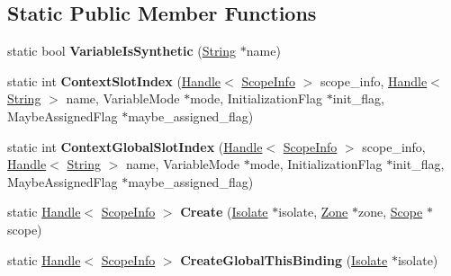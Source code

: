 \subsection*{Static Public Member Functions}
\begin{DoxyCompactItemize}
\item 
static bool {\bfseries Variable\+Is\+Synthetic} (\hyperlink{classv8_1_1internal_1_1_string}{String} $\ast$name)\hypertarget{classv8_1_1internal_1_1_scope_info_a580c5f8d07bb972bbd475b2ade6e18a5}{}\label{classv8_1_1internal_1_1_scope_info_a580c5f8d07bb972bbd475b2ade6e18a5}

\item 
static int {\bfseries Context\+Slot\+Index} (\hyperlink{classv8_1_1internal_1_1_handle}{Handle}$<$ \hyperlink{classv8_1_1internal_1_1_scope_info}{Scope\+Info} $>$ scope\+\_\+info, \hyperlink{classv8_1_1internal_1_1_handle}{Handle}$<$ \hyperlink{classv8_1_1internal_1_1_string}{String} $>$ name, Variable\+Mode $\ast$mode, Initialization\+Flag $\ast$init\+\_\+flag, Maybe\+Assigned\+Flag $\ast$maybe\+\_\+assigned\+\_\+flag)\hypertarget{classv8_1_1internal_1_1_scope_info_a0ca507b103cf2f4f4e1ac74610f721c9}{}\label{classv8_1_1internal_1_1_scope_info_a0ca507b103cf2f4f4e1ac74610f721c9}

\item 
static int {\bfseries Context\+Global\+Slot\+Index} (\hyperlink{classv8_1_1internal_1_1_handle}{Handle}$<$ \hyperlink{classv8_1_1internal_1_1_scope_info}{Scope\+Info} $>$ scope\+\_\+info, \hyperlink{classv8_1_1internal_1_1_handle}{Handle}$<$ \hyperlink{classv8_1_1internal_1_1_string}{String} $>$ name, Variable\+Mode $\ast$mode, Initialization\+Flag $\ast$init\+\_\+flag, Maybe\+Assigned\+Flag $\ast$maybe\+\_\+assigned\+\_\+flag)\hypertarget{classv8_1_1internal_1_1_scope_info_a721994b459c3946c2a8e253ca330370c}{}\label{classv8_1_1internal_1_1_scope_info_a721994b459c3946c2a8e253ca330370c}

\item 
static \hyperlink{classv8_1_1internal_1_1_handle}{Handle}$<$ \hyperlink{classv8_1_1internal_1_1_scope_info}{Scope\+Info} $>$ {\bfseries Create} (\hyperlink{classv8_1_1internal_1_1_isolate}{Isolate} $\ast$isolate, \hyperlink{classv8_1_1internal_1_1_zone}{Zone} $\ast$zone, \hyperlink{classv8_1_1internal_1_1_scope}{Scope} $\ast$scope)\hypertarget{classv8_1_1internal_1_1_scope_info_a52a0467e203dfb2def5631949d10b585}{}\label{classv8_1_1internal_1_1_scope_info_a52a0467e203dfb2def5631949d10b585}

\item 
static \hyperlink{classv8_1_1internal_1_1_handle}{Handle}$<$ \hyperlink{classv8_1_1internal_1_1_scope_info}{Scope\+Info} $>$ {\bfseries Create\+Global\+This\+Binding} (\hyperlink{classv8_1_1internal_1_1_isolate}{Isolate} $\ast$isolate)\hypertarget{classv8_1_1internal_1_1_scope_info_aac2e8627b7b93db7e74d99f5d70fea76}{}\label{classv8_1_1internal_1_1_scope_info_aac2e8627b7b93db7e74d99f5d70fea76}


\end{DoxyCompactItemize}
